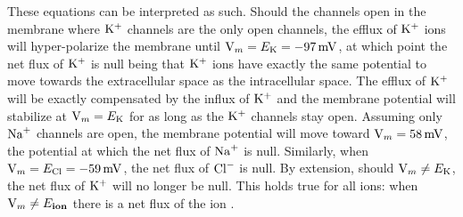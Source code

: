 \documentclass[../../Orator]{subfiles}
\begin{document}
These equations can be interpreted as such. 
Should the channels open in the membrane where \(\mathrm{K}^+\) channels are the only open channels, the efflux of \(\mathrm{K}^+\) ions will hyper-polarize the membrane until \(\Vm = E_\rmm{K} = \qty{-97}{\mV}\), at which point the net flux of \(\mathrm{K}^+\) is null being that \(\mathrm{K}^+\) ions have exactly the same potential to move towards the extracellular space as the intracellular space. 
The efflux of \(\mathrm{K}^+\) will be exactly compensated by the influx of \(\mathrm{K}^+\) and the membrane potential will stabilize at \(\mathrm{V}_m = E_{\mathrm{K}} \) for as long as the \(\mathrm{K}^+\) channels stay open. 
Assuming only \(\mathrm{Na}^+\) channels are open, the membrane potential will move toward \(\Vm = \qty{58}{\mV}\), the potential at which the net flux of \(\mathrm{Na}^+\) is null. 
Similarly, when \(\Vm = E_\rmm{Cl} = \qty{-59}{\mV}\),  
the net flux of \(\mathrm{Cl}^-\) is null. 
By extension, should \(\mathrm{V}_m \neq E_{\mathrm{K}}\), the net flux of  \(\mathrm{K}^+\) will no longer be null. 
This holds true for all ions: when \(\mathrm{V}_m \neq E_{\mathbf{ion}}\) there is a net flux of the ion \cite{}. 
\end{document}
